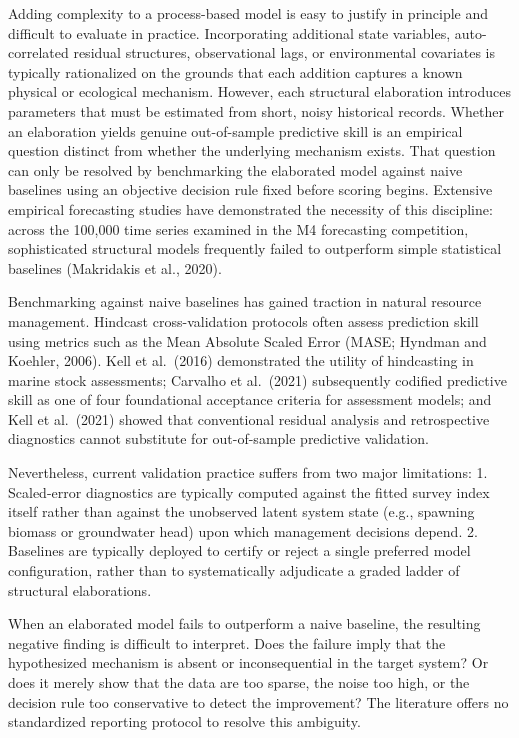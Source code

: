 \documentclass[11pt]{article}
\begin{document}
Adding complexity to a process-based model is easy to justify in
principle and difficult to evaluate in practice. Incorporating
additional state variables, auto-correlated residual structures,
observational lags, or environmental covariates is typically
rationalized on the grounds that each addition captures a known physical
or ecological mechanism. However, each structural elaboration introduces
parameters that must be estimated from short, noisy historical records.
Whether an elaboration yields genuine out-of-sample predictive skill is
an empirical question distinct from whether the underlying mechanism
exists. That question can only be resolved by benchmarking the
elaborated model against naive baselines using an objective decision
rule fixed before scoring begins. Extensive empirical forecasting
studies have demonstrated the necessity of this discipline: across the
100,000 time series examined in the M4 forecasting competition,
sophisticated structural models frequently failed to outperform simple
statistical baselines (Makridakis et al., 2020).

Benchmarking against naive baselines has gained traction in natural
resource management. Hindcast cross-validation protocols often assess
prediction skill using metrics such as the Mean Absolute Scaled Error
(MASE; Hyndman and Koehler, 2006). Kell et al.~(2016) demonstrated the
utility of hindcasting in marine stock assessments; Carvalho et
al.~(2021) subsequently codified predictive skill as one of four
foundational acceptance criteria for assessment models; and Kell et
al.~(2021) showed that conventional residual analysis and retrospective
diagnostics cannot substitute for out-of-sample predictive validation.

Nevertheless, current validation practice suffers from two major
limitations: 1. Scaled-error diagnostics are typically computed against
the fitted survey index itself rather than against the unobserved latent
system state (e.g., spawning biomass or groundwater head) upon which
management decisions depend. 2. Baselines are typically deployed to
certify or reject a single preferred model configuration, rather than to
systematically adjudicate a graded ladder of structural elaborations.

When an elaborated model fails to outperform a naive baseline, the
resulting negative finding is difficult to interpret. Does the failure
imply that the hypothesized mechanism is absent or inconsequential in
the target system? Or does it merely show that the data are too sparse,
the noise too high, or the decision rule too conservative to detect the
improvement? The literature offers no standardized reporting protocol to
resolve this ambiguity.
\end{document}
